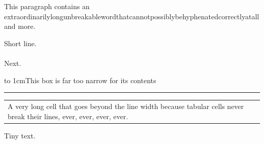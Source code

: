 \documentclass{article}
\begin{document}
This paragraph contains an extraordinarilylongunbreakablewordthatcannotpossiblybehyphenatedcorrectlyatall and more.

Short line.\\\\
Next.

\hbox to 1cm{This box is far too narrow for its contents}

\noindent\rule{1pt}{1.2\textheight}

\begin{tabular}{l}
A very long cell that goes beyond the line width because tabular cells never break their lines, ever, ever, ever, ever.
\end{tabular}

\fontsize{5.5}{6}\selectfont Tiny text.
\end{document}
